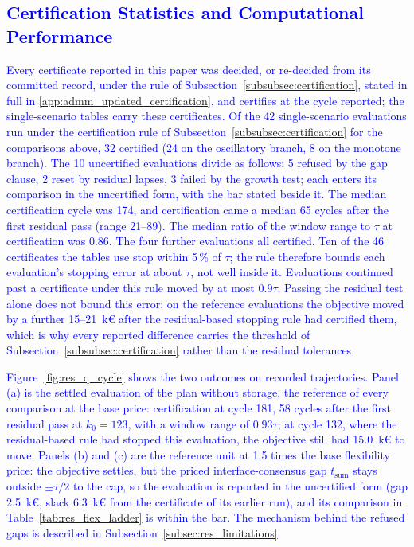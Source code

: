 \documentclass[preprint,12pt]{elsarticle}
\begin{document}
\subsection{\textcolor{blue}{Certification Statistics and Computational Performance}}
\label{subsec:res_certification}

\textcolor{blue}{
    Every certificate reported in this paper was decided, or re-decided from its committed record, under the rule of Subsection~\ref{subsubsec:certification}, stated in full in \ref{app:admm_updated_certification}, and certifies at the cycle reported; the single-scenario tables carry these certificates.
    Of the 42 single-scenario evaluations run under the certification rule of Subsection~\ref{subsubsec:certification} for the comparisons above, 32 certified (24 on the oscillatory branch, 8 on the monotone branch). The 10 uncertified evaluations divide as follows: 5 refused by the gap clause, 2 reset by residual lapses, 3 failed by the growth test; each enters its comparison in the uncertified form, with the bar stated beside it. The median certification cycle was 174, and certification came a median 65 cycles after the first residual pass (range 21--89). The median ratio of the window range to $\tau$ at certification was 0.86. The four further evaluations all certified. Ten of the 46 certificates the tables use stop within 5\,\% of $\tau$; the rule therefore bounds each evaluation's stopping error at about $\tau$, not well inside it. Evaluations continued past a certificate under this rule moved by at most $0.9\tau$. Passing the residual test alone does not bound this error: on the reference evaluations the objective moved by a further 15--21~k\euro{} after the residual-based stopping rule had certified them, which is why every reported difference carries the threshold of Subsection~\ref{subsubsec:certification} rather than the residual tolerances.
}

\textcolor{blue}{
    Figure~\ref{fig:res_q_cycle} shows the two outcomes on recorded trajectories. Panel (a) is the settled evaluation of the plan without storage, the reference of every comparison at the base price: certification at cycle 181, 58 cycles after the first residual pass at $k_0 = 123$, with a window range of $0.93\tau$; at cycle 132, where the residual-based rule had stopped this evaluation, the objective still had 15.0~k\euro{} to move. Panels (b) and (c) are the reference unit at 1.5 times the base flexibility price: the objective settles, but the priced interface-consensus gap $t_{\text{sum}}$ stays outside $\pm\tau/2$ to the cap, so the evaluation is reported in the uncertified form (gap 2.5~k\euro, slack 6.3~k\euro{} from the certificate of its earlier run), and its comparison in Table~\ref{tab:res_flex_ladder} is within the bar. The mechanism behind the refused gaps is described in Subsection~\ref{subsec:res_limitations}.
}
\end{document}
